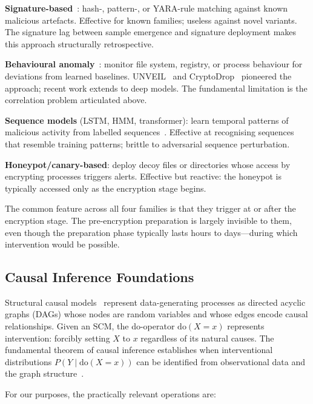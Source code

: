 \documentclass[sigconf,nonacm]{acmart}
\begin{document}
\textbf{Signature-based}~\cite{aboaoja2024sigsurv}: hash-, pattern-,
or YARA-rule matching against known malicious artefacts. Effective for
known families; useless against novel variants. The signature lag
between sample emergence and signature deployment makes this approach
structurally retrospective.

\textbf{Behavioural anomaly}~\cite{kharraz2016unveil,scaife2016cryptolock,
roy2024behavsurv}: monitor file system, registry, or process behaviour
for deviations from learned baselines. UNVEIL~\cite{kharraz2016unveil}
and CryptoDrop~\cite{scaife2016cryptolock} pioneered the approach;
recent work extends to deep models. The fundamental limitation is the
correlation problem articulated above.

\textbf{Sequence models} (LSTM, HMM, transformer): learn temporal
patterns of malicious activity from labelled
sequences~\cite{ahmed2023seqsurv}. Effective at recognising sequences
that resemble training patterns; brittle to adversarial sequence
perturbation.

\textbf{Honeypot/canary-based}: deploy decoy files or directories whose
access by encrypting processes triggers alerts. Effective but reactive:
the honeypot is typically accessed only as the encryption stage begins.

The common feature across all four families is that they trigger at or
after the encryption stage. The pre-encryption preparation is largely
invisible to them, even though the preparation phase typically lasts
hours to days---during which intervention would be possible.

\subsection{Causal Inference Foundations}

Structural causal models~\cite{pearl2009causality} represent
data-generating processes as directed acyclic graphs (DAGs) whose nodes
are random variables and whose edges encode causal relationships. Given
an SCM, the do-operator $\mathrm{do}(X = x)$ represents intervention:
forcibly setting $X$ to $x$ regardless of its natural causes. The
fundamental theorem of causal inference establishes when interventional
distributions $P(Y \mid \mathrm{do}(X = x))$ can be identified from
observational data and the graph
structure~\cite{pearl2009causality,beckers2024causal}.

For our purposes, the practically relevant operations are:
\end{document}
